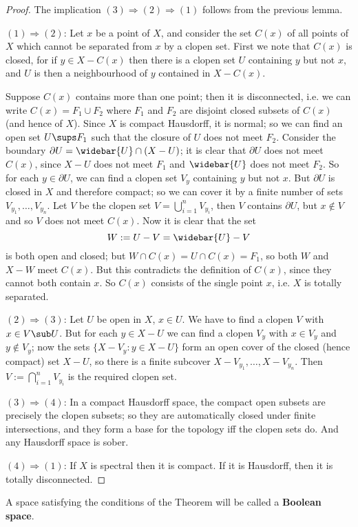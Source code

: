 \begin{proof}
The implication $(3)\Rightarrow(2)\Rightarrow(1)$ follows from the previous lemma.\par
$(1)\Rightarrow(2)$: Let $x$ be a point of $X$, and consider the set $C(x)$ of all points of
$X$ which cannot be separated from $x$ by a clopen set. First we note that $C(x)$ is closed, for if 
$y\in X-C(x)$ then there is a clopen set $U$ containing $y$ but not $x$, and $U$ is then a neighbourhood 
of $y$ contained in $X-C(x)$.\par
Suppose $C(x)$ contains more than one point; then it is disconnected, i.e. we can write $C(x)=F_1\cup F_2$ 
where $F_1$ and $F_2$ are disjoint closed subsets of $C(x)$ (and hence of $X$). Since $X$ is compact Hausdorff, 
it is normal; so we can find an open set $U\sups F_1$ such that the closure of $U$ does not meet $F_2$. Consider the 
boundary $\partial U=\widebar{U}\cap(X-U)$; it is clear that $\partial U$ does not meet $C(x)$, since $X-U$ does not 
meet $F_1$ and $\widebar{U}$ does not meet $F_2$. So for each $y\in\partial U$, we can find a clopen set $V_y$ 
containing $y$ but not $x$. But $\partial U$ is closed in $X$ and therefore compact; so we can cover it by a
finite number of sets $V_{y_1},\dots,V_{y_n}$. Let $V$ be the clopen set $V=\bigcup_{i=1}^{n}V_{y_i}$, then
$V$ contains $\partial U$, but $x\notin V$ and so $V$ does not meet $C(x)$. Now it is clear that the set
\[W:=U-V=\widebar{U}-V\]
is both open and closed; but $W\cap C(x)=U\cap C(x)=F_1$, so both $W$ and $X-W$ meet $C(x)$. But this contradicts 
the definition of $C(x)$, since they cannot both contain $x$. So $C(x)$ consists of the single point $x$, i.e. $X$ is
totally separated.\par
$(2)\Rightarrow(3)$: Let $U$ be open in $X$, $x\in U$. We have to find a clopen $V$ with $x\in V\sub U$. But for each $y\in X-U$ 
we can find a clopen $V_y$ with $x\in V_y$ and $y\notin V_y$; now the sets $\{X-V_y:y\in X-U\}$ form an open cover of the closed 
(hence compact) set $X-U$, so there is a finite subcover $X-V_{y_1},\dots,X-V_{y_n}$. Then $V:=\bigcap_{i=1}^{n}V_{y_i}$ is the required
clopen set.\par
$(3)\Rightarrow(4)$: In a compact Hausdorff space, the compact open subsets are precisely the clopen subsets; so they are automatically 
closed under finite intersections, and they form a base for the topology iff the clopen sets do. And any Hausdorff space is sober.\par
$(4)\Rightarrow(1)$: If $X$ is spectral then it is compact. If it is Hausdorff, then it is totally disconnected.
\end{proof}
A space satisfying the conditions of the Theorem will be called a \textbf{Boolean space}.
